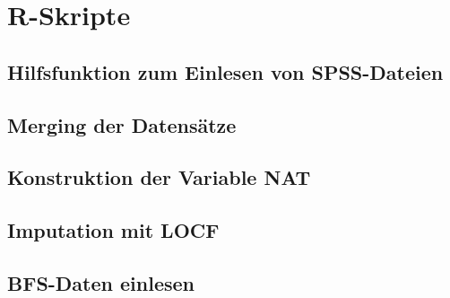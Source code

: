 

\chapter{R-Skripte}
\label{AppendixB}


\section{Hilfsfunktion zum Einlesen von SPSS-Dateien}
\label{sec:hilfsfunktion}




\section{Merging der Datensätze}
\label{sec:merging}




\section{Konstruktion der Variable NAT}
\label{sec:nat}




\section{Imputation mit LOCF}
\label{sec:locf}




\section{BFS-Daten einlesen}
\label{sec:bfs}

